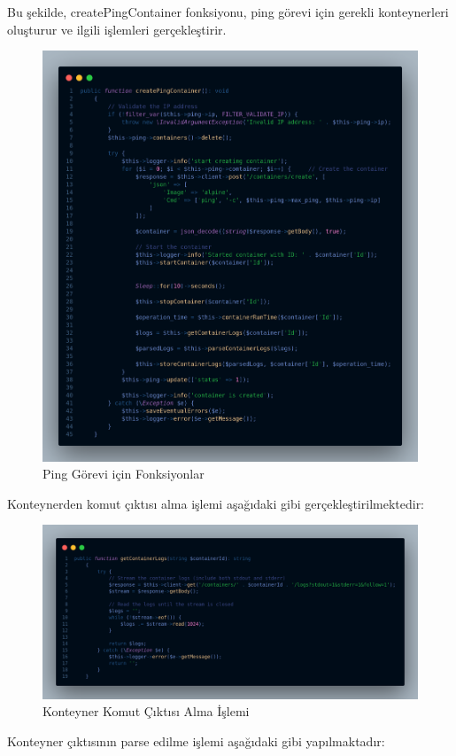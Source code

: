 Bu şekilde, createPingContainer fonksiyonu, ping görevi için gerekli konteynerleri oluşturur ve ilgili işlemleri gerçekleştirir.

\begin{figure}[H]
	\centering
	\includegraphics[width=0.9\linewidth]{images/code_ping.png}
	\caption{Ping Görevi için Fonksiyonlar}
	\label{fig:ping_func}
\end{figure}

Konteynerden komut çıktısı alma işlemi aşağıdaki gibi gerçekleştirilmektedir:

\begin{figure}[H]
	\centering
	\includegraphics[width=0.8\linewidth]{images/code_log.png}
	\caption{Konteyner Komut Çıktısı Alma İşlemi}
	\label{fig:container_cmd_output}
\end{figure}

Konteyner çıktısının parse edilme işlemi aşağıdaki gibi yapılmaktadır:

